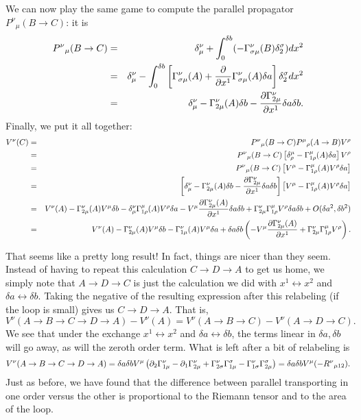 We can now play the same game to compute the parallel propagator ${P^\nu}_\mu(B\to C)$: it is
\begin{eqnarray*}
{P^\nu}_\mu(B\to C)&=&\delta^\nu_\mu +\int_0^{\delta b} (-\Gamma^\nu_{\sigma \mu}(B)\delta^\sigma_2) dx^2\\
&=&\delta^\nu_\mu -\int_0^{\delta b}\left[\Gamma^\nu_{\sigma \mu}(A)+\frac{\partial}{\partial x^1}\Gamma^\nu_{\sigma\mu}(A)\delta a\right]\delta^\sigma_2 dx^2\\
&=&\delta^\nu_\mu-\Gamma^\nu_{2 \mu}(A) \delta b - \frac{\partial\Gamma^\nu_{2\mu}}{\partial x^1}\delta a \delta b.
\end{eqnarray*}
Finally, we put it all together:
\begin{eqnarray*}
V^\nu(C)&=& {P^\nu}_\mu(B\to C){P^\mu}_\rho(A\to B) V^\rho\\
&=&{P^\nu}_\mu(B\to C) \left[\delta^\mu_\rho -\Gamma^\mu_{1\rho}(A) \delta a\right] V^\rho\\
&=&{P^\nu}_\mu(B\to C)\left[ V^\mu-\Gamma^\mu_{1\rho}(A) V^\rho \delta a\right]\\
&=&\left[\delta^\nu_\mu-\Gamma^\nu_{2 \mu}(A) \delta b - \frac{\partial\Gamma^\nu_{2\mu}}{\partial x^1}\delta a \delta b\right]\left[ V^\mu-\Gamma^\mu_{1\rho}(A) V^\rho \delta a\right]\\
&=&V^\nu(A)-\Gamma^\nu_{2\mu}(A)V^\mu \delta b - \delta^\nu_\mu\Gamma^\mu_{1\rho}(A) V^\rho \delta a - V^\mu \frac{\partial \Gamma^\nu_{2\mu}(A)}{\partial x^1}\delta a \delta b +\Gamma^\nu_{2\mu} \Gamma^\mu_{1\rho}V^\rho \delta a \delta b+O(\delta a^2,\delta b^2)\\
&=&V^\nu(A)-\Gamma^\nu_{2\mu}(A)V^\mu \delta b - \Gamma^\nu_{1\mu}(A) V^\mu \delta a + \delta a \delta b \left(-V^\mu \frac{\partial \Gamma^\nu_{2\mu}(A)}{\partial x^1} +\Gamma^\nu_{2\mu} \Gamma^\mu_{1\rho}V^\rho \right).
\end{eqnarray*}

That seems like a pretty long result! In fact, things are nicer than they seem. Instead of having to repeat this calculation $C\to D \to A$ to get us home, we simply note that $A\to D \to C$ is just the calculation we did with $x^1\leftrightarrow x^2$ and $\delta a \leftrightarrow \delta b$. Taking the negative of the resulting expression after this relabeling (if the loop is small) gives us $C\to D \to A$. That is, 
$$V^\nu(A\to B \to C \to D \to A)-V^\nu (A)=V^\nu(A\to B \to C)-V^\nu(A \to D \to C).$$
We see that under the exchange $x^1\leftrightarrow x^2$ and $\delta a \leftrightarrow \delta b$, the terms linear in $\delta a, \delta b$ will go away, as will the zeroth order term. What is left after a bit of relabeling is
$$V^\nu(A\to B \to C \to D \to A)=\delta a \delta b
V^\mu \left(\partial_2 \Gamma^\nu_{1\mu} -\partial_1 \Gamma^\nu_{2 \mu} +\Gamma^\nu_{2\sigma} \Gamma^\sigma_{1\mu} - \Gamma^\nu_{1\sigma} \Gamma^\sigma_{2\mu}\right)=\delta a \delta b V^\mu (-{R^\nu}_{\mu 12}).$$
Just as before, we have found that the difference between parallel transporting in one order versus the other is proportional to the Riemann tensor and to the area of the loop.